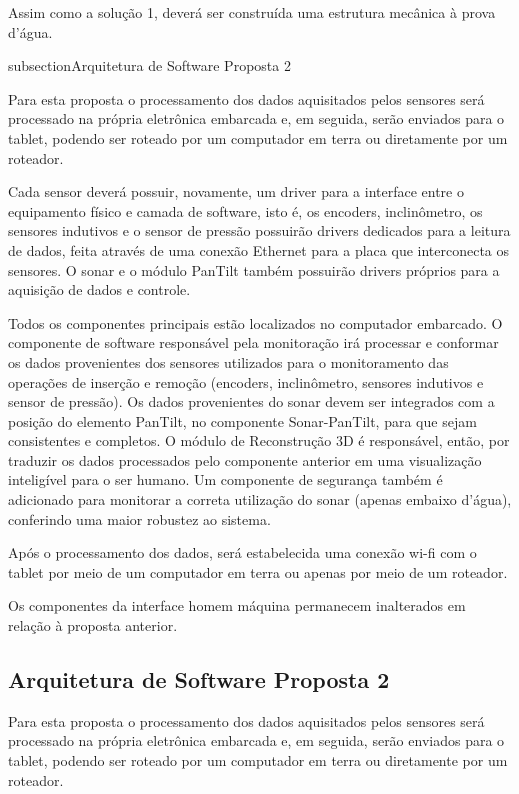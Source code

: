 Assim como a solução 1, deverá ser construída uma estrutura mecânica à prova d’água.

subsection{Arquitetura de Software Proposta 2}

Para esta proposta o processamento dos dados aquisitados pelos sensores será
processado na própria eletrônica embarcada e, em seguida,
 serão enviados para o tablet, podendo ser roteado por um computador em terra ou
 diretamente por um roteador.
 
Cada sensor deverá possuir, novamente, um driver para a interface entre o
equipamento físico e camada de software,
 isto é, os encoders, inclinômetro, os sensores indutivos e o sensor de pressão
 possuirão drivers dedicados para a leitura de dados,
feita através de uma conexão Ethernet para a placa que interconecta os sensores.
O sonar e o módulo PanTilt também possuirão drivers próprios para a aquisição de
dados e controle.

Todos os componentes principais estão localizados no computador embarcado.
O componente de software responsável pela monitoração irá processar e conformar
os dados provenientes dos sensores utilizados para o monitoramento das operações
de inserção e remoção (encoders, inclinômetro, sensores indutivos
 e sensor de pressão). Os dados provenientes do sonar devem ser integrados com a
 posição do elemento PanTilt,
  no componente Sonar-PanTilt, para que sejam consistentes e completos.  O
  módulo de Reconstrução 3D é responsável,
   então, por traduzir os dados processados pelo componente anterior em uma
   visualização inteligível para o ser humano.
Um componente de segurança também é adicionado para monitorar a correta
utilização do sonar (apenas embaixo d’água), conferindo uma maior robustez ao
sistema.

Após o processamento dos dados, será estabelecida uma conexão wi-fi com o tablet
por meio de um computador em terra ou
 apenas por meio de um roteador.
 
Os componentes da interface homem máquina permanecem inalterados em relação à
proposta anterior.


\subsection{Arquitetura de Software Proposta 2}

Para esta proposta o processamento dos dados aquisitados pelos sensores será
processado na própria eletrônica embarcada e, em seguida,
 serão enviados para o tablet, podendo ser roteado por um computador em terra ou
 diretamente por um roteador.
 
